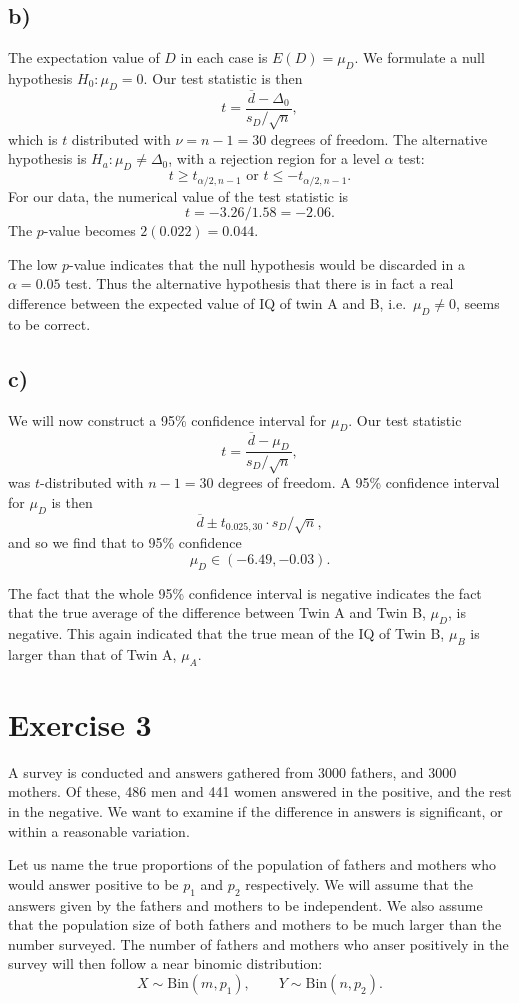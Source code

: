 \documentclass[a4paper, 11pt, titlepage]{article}
\begin{document}
\subsection*{b)}
The expectation value of $D$ in each case is $E(D) = \mu_D$. We formulate a null hypothesis $H_0: \mu_D = 0$. Our test statistic is then
$$t = \frac{\overline{d} - \Delta_0}{s_D/\sqrt{n}},$$
which is $t$ distributed with $\nu = n-1 = 30$ degrees of freedom. The alternative hypothesis is $H_a: \mu_D \neq \Delta_0$, with a rejection region for a level $\alpha$ test:
$$t \geq t_{\alpha/2, n-1} \mbox{  or  } t\leq-t_{\alpha/2, n-1}.$$
For our data, the numerical value of the test statistic is
$$t = -3.26/1.58 = -2.06.$$
The $p$-value becomes $2(0.022) = 0.044$.

The low $p$-value indicates that the null hypothesis would be discarded in a $\alpha=0.05$ test. Thus the alternative hypothesis that there is in fact a real difference between the expected value of IQ of twin A and B, i.e.\ $\mu_D \neq 0$, seems to be correct.

\subsection*{c)}
We will now construct a 95\% confidence interval for $\mu_D$. Our test statistic
$$t = \frac{\overline{d} - \mu_D}{s_D/\sqrt{n}},$$
was $t$-distributed with $n-1=30$ degrees of freedom. A 95\% confidence interval for $\mu_D$ is then
$$\overline{d} \pm t_{0.025, 30}\cdot s_D/\sqrt{n},$$
and so we find that to 95\% confidence
$$\mu_D \in (-6.49, -0.03).$$

The fact that the whole 95\% confidence interval is negative indicates the fact that the true average of the difference between Twin A and Twin B, $\mu_D$, is negative. This again indicated that the true mean of the IQ of Twin B, $\mu_B$ is larger than that of Twin A, $\mu_A$.

\section*{Exercise 3}

A survey is conducted and answers gathered from 3000 fathers, and 3000 mothers. Of these, 486 men and 441 women answered in the positive, and the rest in the negative. We want to examine if the difference in answers is significant, or within a reasonable variation.

Let us name the true proportions of the population of fathers and mothers who would answer positive to be $p_1$ and $p_2$ respectively. We will assume that the answers given by the fathers and mothers to be independent. We also assume that the population size of both fathers and mothers to be much larger than the number surveyed. The number of fathers and mothers who anser positively in the survey will then follow a near binomic distribution:
$$X \sim \mbox{Bin}(m, p_1), \qquad Y \sim \mbox{Bin}(n, p_2).$$
\end{document}
